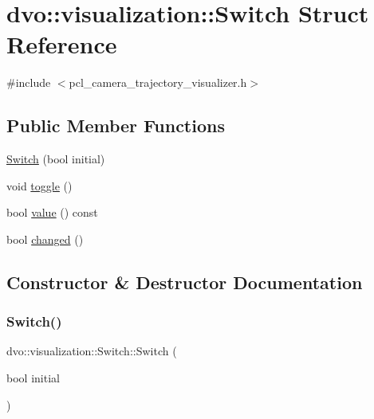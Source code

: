 \hypertarget{structdvo_1_1visualization_1_1_switch}{}\section{dvo\+:\+:visualization\+:\+:Switch Struct Reference}
\label{structdvo_1_1visualization_1_1_switch}


{\ttfamily \#include $<$pcl\+\_\+camera\+\_\+trajectory\+\_\+visualizer.\+h$>$}

\subsection*{Public Member Functions}
\begin{DoxyCompactItemize}
\item 
\mbox{\hyperlink{structdvo_1_1visualization_1_1_switch_a4d601eeee9e3b30de1ebc22c42aa5102}{Switch}} (bool initial)
\item 
void \mbox{\hyperlink{structdvo_1_1visualization_1_1_switch_af618d5fd5a327abf0873defe1532a2c3}{toggle}} ()
\item 
bool \mbox{\hyperlink{structdvo_1_1visualization_1_1_switch_ab4e0d6e3033221e4d052ac0b89b118d1}{value}} () const
\item 
bool \mbox{\hyperlink{structdvo_1_1visualization_1_1_switch_a2c81c1498c9d450c6e8aae1173045954}{changed}} ()
\end{DoxyCompactItemize}


\subsection{Constructor \& Destructor Documentation}
\mbox{\label{structdvo_1_1visualization_1_1_switch_a4d601eeee9e3b30de1ebc22c42aa5102}} 
\subsubsection{\texorpdfstring{Switch()}{Switch()}}
{\footnotesize\ttfamily dvo\+::visualization\+::\+Switch\+::\+Switch (\begin{DoxyParamCaption}\item[{bool}]{initial }\end{DoxyParamCaption})\hspace{0.3cm}{\ttfamily [inline]}}



